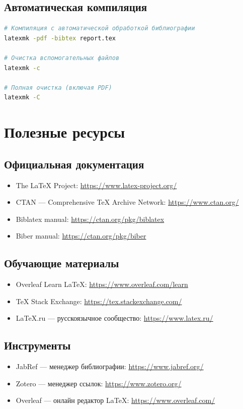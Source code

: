 \documentclass[12pt, a4paper]{article}
\begin{document}
\subsection{Автоматическая компиляция}

\begin{lstlisting}[language=bash, caption={Использование latexmk}]
# Компиляция с автоматической обработкой библиографии
latexmk -pdf -bibtex report.tex

# Очистка вспомогательных файлов
latexmk -c

# Полная очистка (включая PDF)
latexmk -C
\end{lstlisting}

\section{Полезные ресурсы}

\subsection{Официальная документация}

\begin{itemize}
  \item The LaTeX Project: \url{https://www.latex-project.org/}
  \item CTAN — Comprehensive TeX Archive Network: \url{https://www.ctan.org/}
  \item Biblatex manual: \url{https://ctan.org/pkg/biblatex}
  \item Biber manual: \url{https://ctan.org/pkg/biber}
\end{itemize}

\subsection{Обучающие материалы}

\begin{itemize}
  \item Overleaf Learn LaTeX: \url{https://www.overleaf.com/learn}
  \item TeX Stack Exchange: \url{https://tex.stackexchange.com/}
  \item LaTeX.ru — русскоязычное сообщество: \url{https://www.latex.ru/}
\end{itemize}

\subsection{Инструменты}

\begin{itemize}
  \item JabRef — менеджер библиографии: \url{https://www.jabref.org/}
  \item Zotero — менеджер ссылок: \url{https://www.zotero.org/}
  \item Overleaf — онлайн редактор LaTeX: \url{https://www.overleaf.com/}
\end{itemize}
\end{document}
